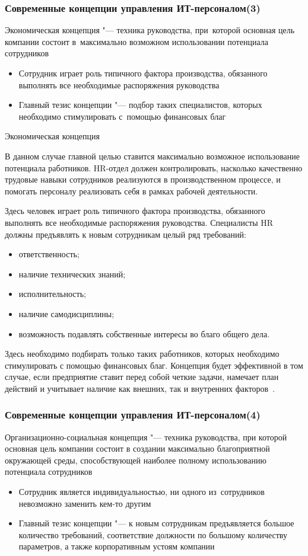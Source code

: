 \documentclass{../industrial-development}
\begin{document}
	\begin{frame} \frametitle{Современные концепции управления ИТ-персоналом(3)}
		
		\alert{Экономическая концепция} "--- техника руководства, при~которой основная цель компании состоит в~максимально возможном использовании потенциала сотрудников
		\begin{itemize}
			\item Сотрудник играет роль типичного фактора производства, обязанного выполнять все необходимые распоряжения руководства
			\item Главный тезис концепции "--- подбор таких специалистов, которых необходимо стимулировать с~помощью финансовых благ
		\end{itemize}
	\end{frame}
	
	\lecturenotes
	
	\alert{Экономическая концепция}
	
	В данном случае главной целью ставится максимально возможное использование потенциала работников. HR-отдел должен контролировать, насколько качественно трудовые навыки сотрудников реализуются в производственном процессе, и помогать персоналу реализовать себя в рамках рабочей деятельности.
	
	Здесь человек играет роль типичного фактора производства, обязанного выполнять все необходимые распоряжения руководства. Специалисты HR должны предъявлять к новым сотрудникам целый ряд требований:
	\begin{itemize}
		\item ответственность;
		\item	наличие технических знаний;
		\item	исполнительность;
		\item	наличие самодисциплины;
		\item	возможность подавлять собственные интересы во благо общего дела.
	\end{itemize}
	
	Здесь необходимо подбирать только таких работников, которых необходимо стимулировать с помощью финансовых благ. Концепция будет эффективной в том случае, если предприятие ставит перед собой четкие задачи, намечает план действий и учитывает наличие как внешних, так и внутренних факторов~\cite{Sovrconcept}. 
	
	\begin{frame} \frametitle{Современные концепции управления ИТ-персоналом(4)}
		\alert{Организационно-социальная концепция} "--- техника руководства, при которой основная цель компании состоит в создании максимально благоприятной окружающей среды, способствующей наиболее полному использованию потенциала сотрудников
		\begin{itemize}
			\item Сотрудник является индивидуальностью, ни одного из~сотрудников невозможно заменить кем-то другим
			\item Главный тезис концепции "---  к новым сотрудникам предъявляется большое количество требований, соответствие должности по большому количеству параметров, а также корпоративным устоям компании
		\end{itemize}
	\end{frame}
	
\end{document}
